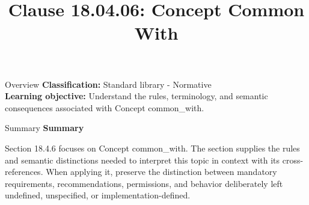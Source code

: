 \documentclass[10pt,letterpaper]{article}
\title{Clause 18.04.06: Concept Common With}
\author{}
\date{}
\begin{document}
\maketitle
\begin{CornellOverviewBox}{Overview}
\textbf{Classification:} Standard library - Normative\\[2pt]
\textbf{Learning objective:} Understand the rules, terminology, and semantic consequences associated with Concept common\_with.
\end{CornellOverviewBox}\begin{CornellSummaryBox}{Summary}
{\sffamily\bfseries\color{Accent} Summary}\par\vspace{3pt}Section 18.4.6 focuses on Concept common\_with. The section supplies the rules and semantic distinctions needed to interpret this topic in context with its cross-references. When applying it, preserve the distinction between mandatory requirements, recommendations, permissions, and behavior deliberately left undefined, unspecified, or implementation-defined.
\end{CornellSummaryBox}
\end{document}
